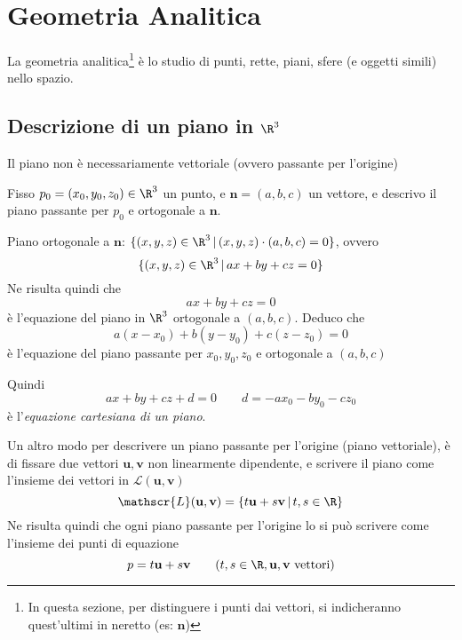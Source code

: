 \section{Geometria Analitica}

La geometria analitica\footnote{In questa sezione, per distinguere i punti dai vettori, si indicheranno quest'ultimi in neretto (es: $\mathbf{n}$)} è lo studio di punti, rette, piani, sfere (e oggetti simili) nello spazio.

\subsection{Descrizione di un piano in $ \R^{3} $} 

Il piano non è necessariamente vettoriale (ovvero passante per l'origine)

Fisso $ p_0=(x_0, y_0, z_0) \in \R^{3} $ un punto, e $ \mathbf{n}=(a,b,c) $ un vettore, e descrivo il piano passante per $ p_0 $ e ortogonale a $ \mathbf{n} $.

Piano ortogonale a $ \mathbf{n} $: $ \{(x,y,z) \in \R^{3}\,|\, (x,y,z) \cdot (a,b,c)=0\} $, ovvero \[
    \{(x,y,z) \in \R^{3}\,|\, ax+by+cz=0\}
\]
Ne risulta quindi che \begin{equation}
    ax+by+cz=0
\end{equation} è l'equazione del piano in $ \R^{3} $ ortogonale a $ (a,b,c) $. Deduco che \begin{equation}
    a(x-x_0)+b(y-y_0)+c(z-z_0)=0
\end{equation} è l'equazione del piano passante per $ x_0, y_0, z_0 $ e ortogonale a $ (a,b,c) $

Quindi \begin{equation}
    ax+by+cz+d=0\qquad d=-ax_0-by_0-cz_0
\end{equation} è l'\textit{equazione cartesiana di un piano}.

Un altro modo per descrivere un piano passante per l'origine (piano vettoriale), è di fissare due vettori $ \mathbf{u}, \mathbf{v} $ non linearmente dipendente, e scrivere il piano come l'insieme dei vettori in $ \mathscr{L}(\mathbf{u}, \mathbf{v}) $ \[
    \mathscr{L}(\mathbf{u}, \mathbf{v})=\{t\mathbf{u}+s\mathbf{v}\,|\, t, s \in \R\}
\]
Ne risulta quindi che ogni piano passante per l'origine lo si può scrivere come l'insieme dei punti di equazione \[
    p=t\mathbf{u}+s\mathbf{v}\qquad (t,s \in \R, \mathbf{u},\mathbf{v} \text{ vettori})
\]

